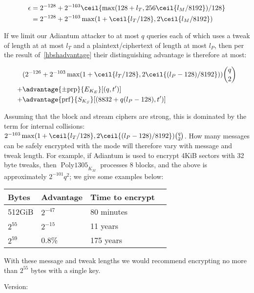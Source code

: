 \documentclass[journal=tosc,preprint,floatrow,submission]{iacrtrans}
\DeclareMathOperator{\Polydjb}{Poly1305}
\begin{document}
\begin{align*}
\epsilon &= 2^{-128} + 2^{-103}\ceil{\max(128 + l_T, 256\ceil{l_M/8192})/128}  \\
&= 2^{-128} + 2^{-103}\max(1 + \ceil{l_T/128}, 2\ceil{l_M/8192})
\end{align*}

If we limit our Adiantum attacker to at most $q$ queries each of which uses a tweak of length at
at most $l_T$ and a plaintext/ciphertext of length at most $l_P$, then per the result
of~\autoref{hbshadvantage} their distinguishing advantage is therefore at most:

\begin{align*}
&( 2^{-126} + 2^{-103}\max(1 + \ceil{l_T/128}, 2\ceil{(l_P - 128)/8192}))\binom{q}{2} \\
+& \advantage{\pm \mathrm{prp}}{E_{K_E}}[(q, t')] \\
+& \advantage{\mathrm{prf}}{S_{K_S}}[(8832 + q(l_P - 128), t')] \\
\end{align*}

Assuming that the block and stream ciphers are strong, this is dominated by the term for
internal collisions: $2^{-103}\max(1 + \ceil{l_T/128}, 2\ceil{(l_P - 128)/8192})\binom{q}{2}$.
How many messages can be safely encrypted with the mode will therefore vary with message and
tweak length. For example, if Adiantum is used to encrypt 4KiB sectors with 32 byte tweaks,
then $\Polydjb_{K_M}$ processes 8 blocks, and the above is approximately $2^{-101}q^2$;
we give some examples below:

\vspace{0.3cm}
\begin{tabular}{lllp{7cm}}
    Bytes & Advantage & Time to encrypt \\
    \hline
    512GiB & $2^{-47}$ & 80 minutes  \\
    $2^{55}$ & $2^{-15}$ & 11 years \\
    $2^{59}$ & 0.8\% & 175 years &
\end{tabular}
\vspace{0.3cm}

With these message and tweak lengths
we would recommend encrypting no more than $2^{55}$ bytes with a single key.

\vspace*{\fill}
Version: \texttt{}
\end{document}
